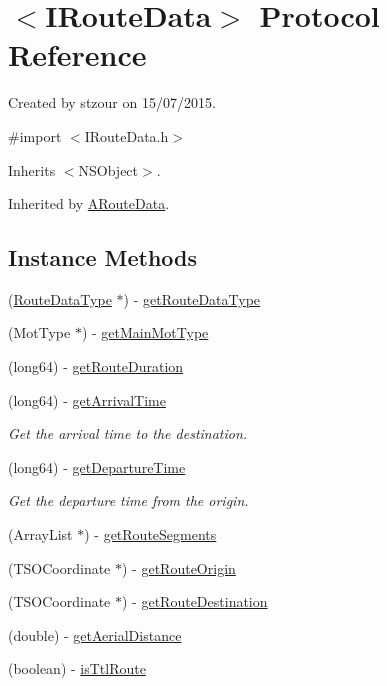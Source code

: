 \hypertarget{protocol_i_route_data-p}{}\section{$<$I\+Route\+Data$>$ Protocol Reference}
\label{protocol_i_route_data-p}


Created by stzour on 15/07/2015.  




{\ttfamily \#import $<$I\+Route\+Data.\+h$>$}



Inherits $<$\+N\+S\+Object$>$.



Inherited by \hyperlink{interface_a_route_data}{A\+Route\+Data}.

\subsection*{Instance Methods}
\begin{DoxyCompactItemize}
\item 
(\hyperlink{interface_route_data_type}{Route\+Data\+Type} $\ast$) -\/ \hyperlink{protocol_i_route_data-p_a4df31a87bea9720e673638d267e83bc0}{get\+Route\+Data\+Type}
\item 
(Mot\+Type $\ast$) -\/ \hyperlink{protocol_i_route_data-p_a4014ff3249e3565565cd64857c028796}{get\+Main\+Mot\+Type}
\item 
(long64) -\/ \hyperlink{protocol_i_route_data-p_ab35b9ecfc71d31859544e5b125883d8d}{get\+Route\+Duration}
\item 
(long64) -\/ \hyperlink{protocol_i_route_data-p_a3ec47dbf095790ccaff50638570cc8bc}{get\+Arrival\+Time}
\begin{DoxyCompactList}\small\item\em Get the arrival time to the destination. \end{DoxyCompactList}\item 
(long64) -\/ \hyperlink{protocol_i_route_data-p_a29e2cadfa6dc8302ae257ee771d71b03}{get\+Departure\+Time}
\begin{DoxyCompactList}\small\item\em Get the departure time from the origin. \end{DoxyCompactList}\item 
(Array\+List $\ast$) -\/ \hyperlink{protocol_i_route_data-p_ae659fc780b890d339f59908583f30028}{get\+Route\+Segments}
\item 
(T\+S\+O\+Coordinate $\ast$) -\/ \hyperlink{protocol_i_route_data-p_ab227806f25364fdc2202bfd86df71570}{get\+Route\+Origin}
\item 
(T\+S\+O\+Coordinate $\ast$) -\/ \hyperlink{protocol_i_route_data-p_a9b36e4b77bfdbd582afd144c10626824}{get\+Route\+Destination}
\item 
(double) -\/ \hyperlink{protocol_i_route_data-p_aaf707f50d17f0f84f38403bf53526bb7}{get\+Aerial\+Distance}
\item 
(boolean) -\/ \hyperlink{protocol_i_route_data-p_ac9c0dcc96c2755b3f8e58150a1847d85}{is\+Ttl\+Route}
\end{DoxyCompactItemize}


